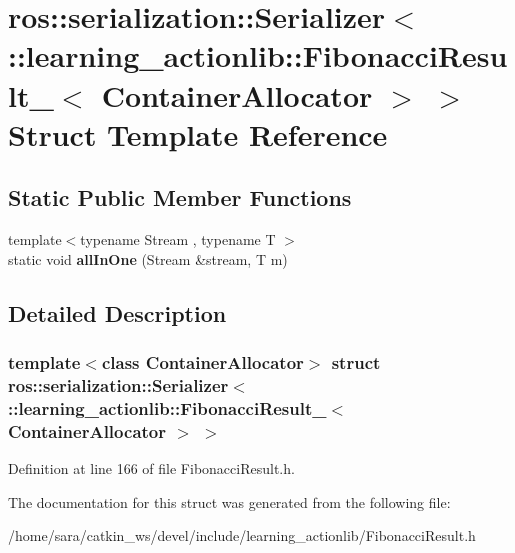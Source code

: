 \hypertarget{structros_1_1serialization_1_1Serializer_3_01_1_1learning__actionlib_1_1FibonacciResult___3_01ContainerAllocator_01_4_01_4}{}\section{ros\+:\+:serialization\+:\+:Serializer$<$ \+:\+:learning\+\_\+actionlib\+:\+:Fibonacci\+Result\+\_\+$<$ Container\+Allocator $>$ $>$ Struct Template Reference}
\label{structros_1_1serialization_1_1Serializer_3_01_1_1learning__actionlib_1_1FibonacciResult___3_01ContainerAllocator_01_4_01_4}
\subsection*{Static Public Member Functions}
\begin{DoxyCompactItemize}
\item 
\mbox{\label{structros_1_1serialization_1_1Serializer_3_01_1_1learning__actionlib_1_1FibonacciResult___3_01ContainerAllocator_01_4_01_4_adf2030758d19cd47fdde4ebba44f738c}} 
{\footnotesize template$<$typename Stream , typename T $>$ }\\static void {\bfseries all\+In\+One} (Stream \&stream, T m)
\end{DoxyCompactItemize}


\subsection{Detailed Description}
\subsubsection*{template$<$class Container\+Allocator$>$\newline
struct ros\+::serialization\+::\+Serializer$<$ \+::learning\+\_\+actionlib\+::\+Fibonacci\+Result\+\_\+$<$ Container\+Allocator $>$ $>$}



Definition at line 166 of file Fibonacci\+Result.\+h.



The documentation for this struct was generated from the following file\+:\begin{DoxyCompactItemize}
\item 
/home/sara/catkin\+\_\+ws/devel/include/learning\+\_\+actionlib/Fibonacci\+Result.\+h\end{DoxyCompactItemize}
